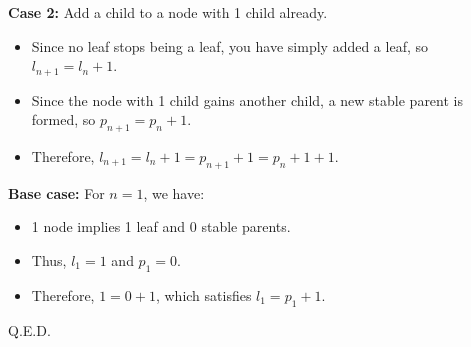 \documentclass[11pt,fleqn]{article}
\theoremstyle{definition}
\theoremstyle{remark}
\begin{document}
    \textbf{Case 2:} Add a child to a node with 1 child already.
    \begin{itemize}
        \item Since no leaf stops being a leaf, you have simply added a leaf, so \( l_{n+1} = l_n + 1 \).
        \item Since the node with 1 child gains another child, a new stable parent is formed, so \( p_{n+1} = p_n + 1 \).
        \item Therefore, \( l_{n+1} = l_n + 1 = p_{n+1} + 1 = p_n + 1 + 1 \).
    \end{itemize}

    \noindent \textbf{Base case:} For \( n = 1 \), we have:
    \begin{itemize}
        \item 1 node implies 1 leaf and 0 stable parents.
        \item Thus, \( l_1 = 1 \) and \( p_1 = 0 \).
        \item Therefore, \( 1 = 0 + 1 \), which satisfies \( l_1 = p_1 + 1 \).
    \end{itemize}

    \noindent Q.E.D.
\newpage
\clearpage
\end{document}
